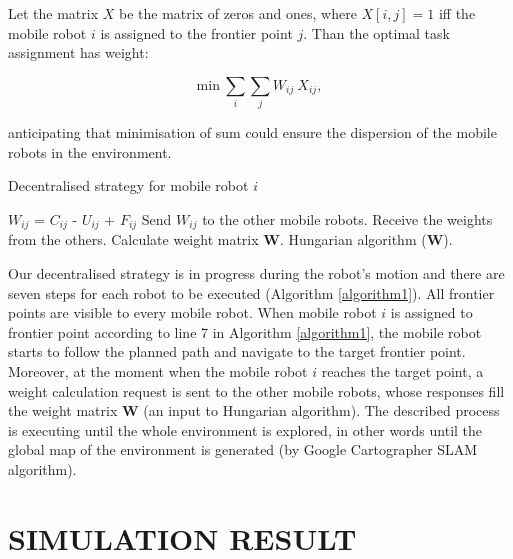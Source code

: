 \documentclass[letterpaper, 10 pt, conference]{ieeeconf}  %
\begin{document}
Let the matrix $X$ be the matrix of zeros and ones, where $X[i,j]=1$ iff the mobile robot $i$ is assigned to the frontier point $j$.
Than the optimal task assignment has weight:

\begin{equation}
     {\mathrm{min}}\ \sum_{i} \sum_{j} W_{ij}\ X_{ij},
\end{equation}

anticipating that minimisation of sum could ensure the dispersion of the mobile robots in the environment. 

\begin{algorithm}[H]
\caption{Decentralised strategy for mobile robot $i$}
\label{algorithm1}
\begin{algorithmic}[1]
\State\hspace{\algorithmicindent} $W_{ij}$ = $C_{ij}$ - $U_{ij}$ + $F_{ij}$
\State\hspace{\algorithmicindent} Send $W_{ij}$ to the other mobile robots.
\State \hspace{\algorithmicindent} Receive the weights from the others.
\State \hspace{\algorithmicindent} Calculate weight matrix $\boldsymbol{W}$.
\State \hspace{\algorithmicindent} Hungarian algorithm ($\boldsymbol{W}$).
\EndFor
\end{algorithmic}
\end{algorithm}


Our decentralised strategy is in progress during the robot's motion and there are seven steps for each robot to be executed (Algorithm \ref{algorithm1}).  All frontier points are visible to every mobile robot.
When mobile robot $i$ is assigned to frontier point according to line 7 in Algorithm \ref{algorithm1}, the mobile robot starts to follow the planned path and navigate to the target frontier point. Moreover, at the moment when the mobile robot $i$ reaches the target point, a weight calculation request is sent to the other mobile robots, whose responses fill the  weight matrix $\boldsymbol{W}$ (an input to Hungarian algorithm). The described process is executing until the whole environment is explored, in other words until the global map of the environment is generated (by Google Cartographer SLAM algorithm).



\section{SIMULATION RESULT}
\end{document}
